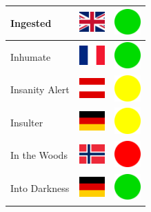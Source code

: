 \documentclass[12pt, a4paper, twoside]{report}
\begin{document}
\begin{center}
\begin{longtable}{|p{5cm}|p{2cm}|p{2cm}|}
 Ingested                                                   & \includegraphics[width=1cm]{4x3/gb} &   \includegraphics[width=1cm]{likes/y} \\ \hline
 Inhumate                                                   & \includegraphics[width=1cm]{4x3/fr} &   \includegraphics[width=1cm]{likes/y} \\ \hline
 Insanity Alert                                             & \includegraphics[width=1cm]{4x3/at} &   \includegraphics[width=1cm]{likes/m} \\ \hline
 Insulter                                                   & \includegraphics[width=1cm]{4x3/de} &   \includegraphics[width=1cm]{likes/m} \\ \hline
 In the Woods                                               & \includegraphics[width=1cm]{4x3/no} &   \includegraphics[width=1cm]{likes/n} \\ \hline
 Into Darkness                                              & \includegraphics[width=1cm]{4x3/de} &   \includegraphics[width=1cm]{likes/y} \\ \hline

\end{longtable}
\end{center}
\end{document}
